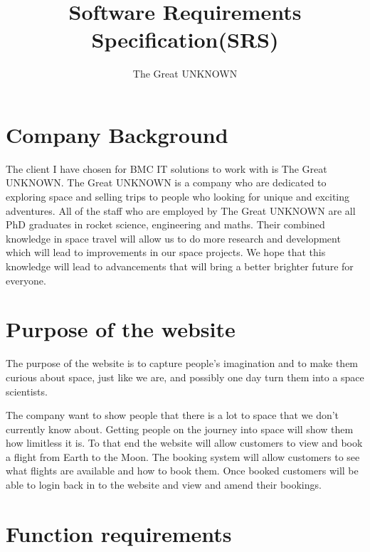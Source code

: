 \documentclass{article}
\title{Software Requirements Specification(SRS)}
\author{The Great UNKNOWN}
\begin{document}
\maketitle

\tableofcontents

\section{Company Background}
The client I have chosen for BMC IT solutions to work with is The Great UNKNOWN. The Great UNKNOWN is a company who are dedicated to exploring space and selling trips to people who looking for unique and exciting adventures. All of the staff who are employed by The Great UNKNOWN are all PhD graduates in rocket science, engineering and maths. Their combined knowledge in space travel will allow us to do more research and development which will lead to improvements in our space projects. We hope that this knowledge will lead to advancements that will bring a better brighter future for everyone.

\section{Purpose of the website}
The purpose of the website is to capture people's imagination and to make them curious about space, just like we are, and possibly one day turn them into a space scientists.

The company want to show people that there is a lot to space that we don’t currently know about. Getting people on the journey into space will show them how limitless it is. To that end the website will allow customers to view and book a flight from Earth to the Moon. The booking system will allow customers to see what flights are available and how to book them. Once booked customers will be able to login back in to the website and view and amend their bookings.


\section{Function requirements}
\end{document}
